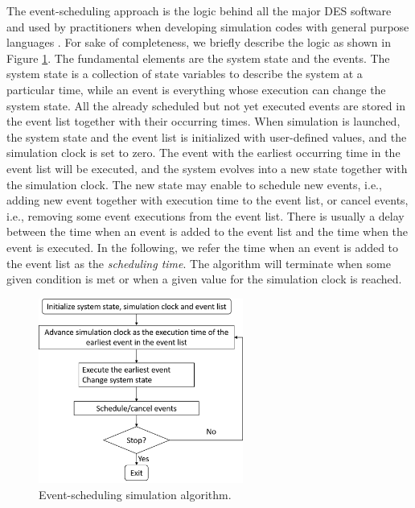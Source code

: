 \documentclass[]{interact}
\theoremstyle{plain}%
\theoremstyle{definition}
\theoremstyle{remark}
\begin{document}
The event-scheduling approach is the logic behind all the major DES software and used by practitioners when developing simulation codes with general purpose languages \citep{law2014simulation}. For sake of completeness, we briefly describe the logic as shown in Figure \ref{Fig:SimAlgo}. The fundamental elements are the system state and the events. The system state is a collection of state variables to describe the system at a particular time, while an event is everything whose execution can change the system state. %
All the already scheduled but not yet executed events are stored in the event list together with their occurring times. %
When simulation is launched, the system state and the event list is initialized with user-defined values, and the simulation clock is set to zero. The event with the earliest occurring time in the event list will be executed, and the system evolves into a new state together with the simulation clock. The new state may enable to schedule new events, i.e., adding new event together with execution time to the event list, or cancel events, i.e., removing some event executions from the event list. There is usually a delay between the time when an event is added to the event list and the time when the event is executed. %
In the following, we refer the time when an event is added to the event list as the \textit{scheduling time}. The algorithm will terminate when some given condition is met or when a given value for the simulation clock is reached.

\begin{figure}[h]
	\centering
	\includegraphics[width=0.6\textwidth]{Figures/EventSimAlgo.png}
	\caption{Event-scheduling simulation algorithm.}
	\label{Fig:SimAlgo}
\end{figure}
\end{document}
